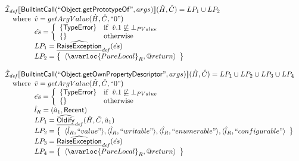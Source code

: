 \[\begin{array}{l}
\aI_{\it def}\lbr \SF{BuiltintCall}(``\SF{Object.getPrototypeOf}",args)\rbr(\hat{H},\hat{C}) = LP_1 \cup LP_2\\
\quad\wherec{
  \hat{v} = getArgValue(\hat{H}, \hat{C}, ``0")\\
  \hat{es} = \left\{\begin{array}{ll}
      \{ \SF{TypeError} \}
      & \ifc{\hat{v}.1 \not\sqsubseteq \bot_{PValue}}\\
      \set{} & \owc
    \end{array}\right.\\
  LP_1 = \ahf{RaiseException}_{\it def}(\hat{es})\\
  LP_2 = \set{\langle\avarloc{PureLocal}_R,\varprop{return}\rangle}\\
  }\\
\\

\aI_{\it def}\lbr \SF{BuiltintCall}(``\SF{Object.getOwnPropertyDescriptor}",args)\rbr(\hat{H},\hat{C}) = LP_1 \cup LP_2 \cup LP_3 \cup LP_4\\
\quad\wherec{
  \hat{v} = getArgValue(\hat{H}, \hat{C}, ``0")\\
  \hat{es} = \left\{\begin{array}{ll}
      \{ \SF{TypeError} \}
      & \ifc{\hat{v}.1 \not\sqsubseteq \bot_{PValue}}\\
      \set{} & \owc
    \end{array}\right.\\
  \hat{l}_R = (\hat{a}_1, \SF{Recent})\\
  LP_1 = \ahf{Oldify}_{\it def}(\hat{H}, \hat{C}, \hat{a}_1)\\
  LP_2 = \set{\langle\hat{l}_R,``value"\rangle,\langle\hat{l}_R,``writable"\rangle,\langle\hat{l}_R,``enumerable"\rangle,\langle\hat{l}_R,``configurable"\rangle}\\
  LP_3 = \ahf{RaiseException}_{\it def}(\hat{es})\\
  LP_4 = \set{\langle\avarloc{PureLocal}_R,\varprop{return}\rangle}\\
  }\\
\\


\end{array}\]
